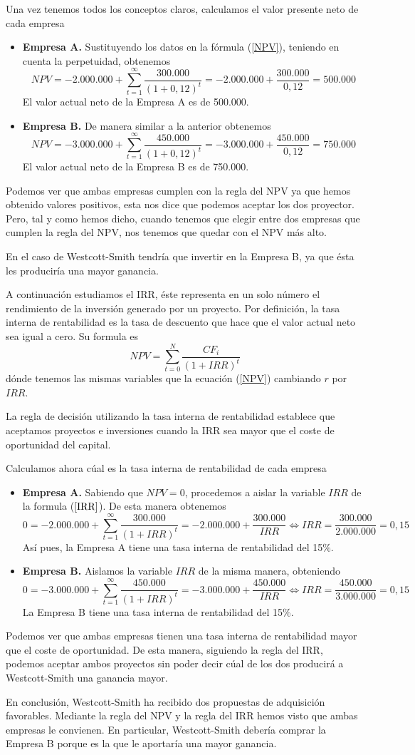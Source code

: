 \documentclass[a4paper]{article}
\begin{document}
Una vez tenemos todos los conceptos claros, calculamos el valor presente neto de cada empresa
\begin{itemize}
    \item \textbf{Empresa A.} Sustituyendo los datos en la fórmula (\ref{NPV}), teniendo en cuenta la perpetuidad, obtenemos
    $$NPV=-2.000.000+\sum_{t=1}^{\infty}\frac{300.000}{(1+0,12)^t}=-2.000.000+\frac{300.000}{0,12}=500.000$$
    El valor actual neto de la Empresa A es de 500.000\EUR.
    \item \textbf{Empresa B.} De manera similar a la anterior obtenemos
    $$NPV=-3.000.000+\sum_{t=1}^{\infty}\frac{450.000}{(1+0,12)^t}=-3.000.000+\frac{450.000}{0,12}=750.000$$
    El valor actual neto de la Empresa B es de 750.000\EUR. 
\end{itemize}
Podemos ver que ambas empresas cumplen con la regla del NPV ya que hemos obtenido valores positivos, esta nos dice que podemos aceptar los dos proyector. Pero, tal y como hemos dicho, cuando tenemos que elegir entre dos empresas que cumplen la regla del NPV, nos tenemos que quedar con el NPV más alto. 

En el caso de Westcott-Smith tendría que invertir en la Empresa B, ya que ésta les produciría una mayor ganancia.

A continuación estudiamos el IRR, éste representa en un solo número el rendimiento de la inversión generado por un proyecto. Por definición, la tasa interna de rentabilidad es la tasa de descuento que hace que el valor actual neto sea igual a cero. Su formula es
\begin{equation}
    NPV=\sum_{t=0}^{N}\frac{CF_i}{(1+IRR)^t}
    \label{IRR}
\end{equation}
dónde tenemos las mismas variables que la ecuación (\ref{NPV}) cambiando $r$ por $IRR$. 

La regla de decisión utilizando la tasa interna de rentabilidad establece que aceptamos proyectos e inversiones cuando la IRR sea mayor que el coste de oportunidad del capital. 

Calculamos ahora cúal es la tasa interna de rentabilidad de cada empresa
\begin{itemize}
    \item \textbf{Empresa A.} Sabiendo que $NPV=0$, procedemos a aislar la variable $IRR$ de la formula ($\ref{IRR}$). De esta manera obtenemos
    $$0=-2.000.000+\sum_{t=1}^{\infty}\frac{300.000}{(1+IRR)^t}=-2.000.000+\frac{300.000}{IRR}\Longleftrightarrow IRR=\frac{300.000}{2.000.000}=0,15 $$
    Así pues, la Empresa A tiene una tasa interna de rentabilidad del 15\%.
    \item \textbf{Empresa B.} Aislamos la variable $IRR$ de la misma manera, obteniendo
    $$0=-3.000.000+\sum_{t=1}^{\infty}\frac{450.000}{(1+IRR)^t}=-3.000.000+\frac{450.000}{IRR}\Longleftrightarrow IRR=\frac{450.000}{3.000.000}=0,15 $$
    La Empresa B tiene una tasa interna de rentabilidad del 15\%.
\end{itemize}
Podemos ver que ambas empresas tienen una tasa interna de rentabilidad mayor que el coste de oportunidad. De esta manera, siguiendo la regla del IRR, podemos aceptar ambos proyectos sin poder decir cúal de los dos producirá a Westcott-Smith una ganancia mayor.

En conclusión, Westcott-Smith ha recibido dos propuestas de adquisición favorables. Mediante la regla del NPV y la regla del IRR hemos visto que ambas empresas le convienen. En particular, Westcott-Smith debería comprar la Empresa B porque es la que le aportaría una mayor ganancia. 
\end{document}
